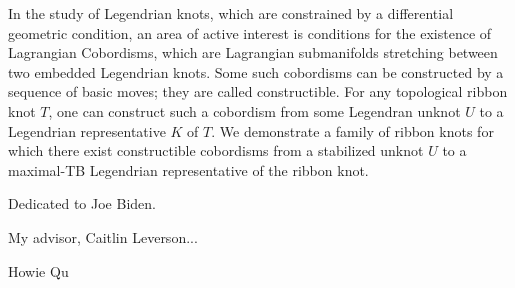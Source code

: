 \documentclass[11pt,twoside,reqno]{book}
\begin{document}

\abstr


In the study of Legendrian knots, which are constrained by a differential geometric condition, an area of active interest is conditions for the existence of Lagrangian Cobordisms, which are Lagrangian submanifolds stretching between two embedded Legendrian knots.
Some such cobordisms can be constructed by a sequence of basic moves; they are called constructible.
For any topological ribbon knot $T$, one can construct such a cobordism from some Legendran unknot $U$ to a Legendrian representative $K$ of $T$.
We demonstrate a family of ribbon knots for which there exist constructible cobordisms from a stabilized unknot $U$ to a maximal-TB Legendrian representative of the ribbon knot.

\dedic

Dedicated to Joe Biden.

\acknowl

My advisor, Caitlin Leverson...

Howie Qu

\tableofcontents

\startmain







\begin{appendices}
    
\end{appendices}

\printbibliography[heading=bibintoc]
\end{document}
